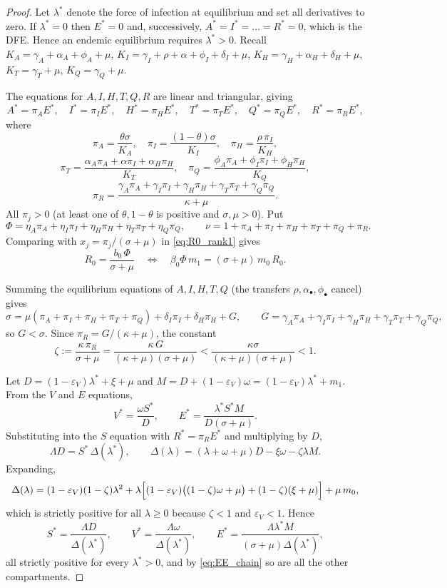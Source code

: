 \documentclass[12pt,a4paper]{article}
\theoremstyle{definition}
\theoremstyle{remark}
\begin{document}
\begin{proof}

Let $\lambda^*$ denote the force of infection at equilibrium and set all
derivatives to zero. If $\lambda^*=0$ then $E^*=0$ and, successively,
$A^*=I^*=\dots=R^*=0$, which is the DFE. Hence an endemic equilibrium requires
$\lambda^*>0$. Recall
$K_A=\gamma_A+\alpha_A+\phi_A+\mu$, $K_I=\gamma_I+\rho+\alpha+\phi_I+\delta_I+\mu$,
$K_H=\gamma_H+\alpha_H+\delta_H+\mu$, $K_T=\gamma_T+\mu$, $K_Q=\gamma_Q+\mu$.


The equations for $A,I,H,T,Q,R$ are linear and triangular, giving
\begin{equation}\label{eq:EE_chain}
A^*=\pi_AE^*,\quad I^*=\pi_IE^*,\quad H^*=\pi_HE^*,\quad
T^*=\pi_TE^*,\quad Q^*=\pi_QE^*,\quad R^*=\pi_RE^*,
\end{equation}
where
\[
\pi_A=\frac{\theta\sigma}{K_A},\quad
\pi_I=\frac{(1-\theta)\sigma}{K_I},\quad
\pi_H=\frac{\rho\,\pi_I}{K_H},
\]
\[
\pi_T=\frac{\alpha_A\pi_A+\alpha\pi_I+\alpha_H\pi_H}{K_T},\quad
\pi_Q=\frac{\phi_A\pi_A+\phi_I\pi_I+\phi_H\pi_H}{K_Q},
\]
\[
\pi_R=\frac{\gamma_A\pi_A+\gamma_I\pi_I+\gamma_H\pi_H+\gamma_T\pi_T+\gamma_Q\pi_Q}{\kappa+\mu}.
\]
All $\pi_j>0$ (at least one of $\theta,1-\theta$ is positive and
$\sigma,\mu>0$). Put
\[
\Phi=\eta_A\pi_A+\eta_I\pi_I+\eta_H\pi_H+\eta_T\pi_T+\eta_Q\pi_Q,\qquad
\nu=1+\pi_A+\pi_I+\pi_H+\pi_T+\pi_Q+\pi_R .
\]
Comparing with $x_j=\pi_j/(\sigma+\mu)$ in \eqref{eq:R0_rank1} gives
\begin{equation}\label{eq:R0_Phi}
R_0=\frac{b_0\,\Phi}{\sigma+\mu}\quad\Longleftrightarrow\quad
\beta_0\Phi\,m_1=(\sigma+\mu)\,m_0\,R_0 .
\end{equation}


Summing the equilibrium equations of $A,I,H,T,Q$ (the transfers
$\rho,\alpha_\bullet,\phi_\bullet$ cancel) gives
\[
\sigma=\mu(\pi_A+\pi_I+\pi_H+\pi_T+\pi_Q)+\delta_I\pi_I+\delta_H\pi_H+G,
\qquad G=\gamma_A\pi_A+\gamma_I\pi_I+\gamma_H\pi_H+\gamma_T\pi_T+\gamma_Q\pi_Q,
\]
so $G<\sigma$. Since $\pi_R=G/(\kappa+\mu)$, the constant
\[
\zeta:=\frac{\kappa\,\pi_R}{\sigma+\mu}=\frac{\kappa\,G}{(\kappa+\mu)(\sigma+\mu)}
<\frac{\kappa\sigma}{(\kappa+\mu)(\sigma+\mu)}<1 .
\]


Let $D=(1-\varepsilon_V)\lambda^*+\xi+\mu$ and
$M=D+(1-\varepsilon_V)\omega=(1-\varepsilon_V)\lambda^*+m_1$. From the $V$ and $E$
equations,
\[
V^*=\frac{\omega S^*}{D},\qquad
E^*=\frac{\lambda^*S^*M}{D(\sigma+\mu)} .
\]
Substituting into the $S$ equation with $R^*=\pi_RE^*$ and multiplying by $D$,
\[
\Lambda D=S^*\,\Delta(\lambda^*),\qquad
\Delta(\lambda)=(\lambda+\omega+\mu)D-\xi\omega-\zeta\lambda M .
\]
Expanding,
\[
\Delta(\lambda)=(1-\varepsilon_V)(1-\zeta)\lambda^2
+\lambda\Bigl[(1-\varepsilon_V)\bigl((1-\zeta)\omega+\mu\bigr)+(1-\zeta)(\xi+\mu)\Bigr]
+\mu\,m_0,
\]
which is strictly positive for all $\lambda\ge0$ because $\zeta<1$ and
$\varepsilon_V<1$. Hence
\begin{equation}\label{eq:EE_SVE}
S^*=\frac{\Lambda D}{\Delta(\lambda^*)},\qquad
V^*=\frac{\Lambda\omega}{\Delta(\lambda^*)},\qquad
E^*=\frac{\Lambda\lambda^*M}{(\sigma+\mu)\Delta(\lambda^*)},
\end{equation}
all strictly positive for every $\lambda^*>0$, and by \eqref{eq:EE_chain} so are
all the other compartments.



\end{proof}
\end{document}
